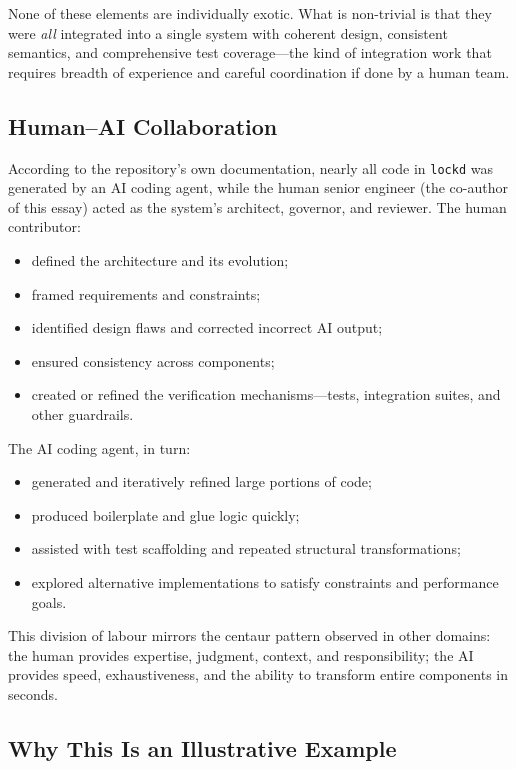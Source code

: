 \documentclass[11pt, a4paper, twocolumn]{article} %
\begin{document}
None of these elements are individually exotic. What is non-trivial is that they
were \emph{all} integrated into a single system with coherent design, consistent
semantics, and comprehensive test coverage---the kind of integration work that
requires breadth of experience and careful coordination if done by a human team.

\newpage
\subsection*{Human--AI Collaboration}

According to the repository’s own documentation, nearly all code in
\texttt{lockd} was generated by an AI coding agent, while the human senior
engineer (the co-author of this essay) acted as the system’s architect,
governor, and reviewer. The human contributor:
\begin{itemize}
    \item defined the architecture and its evolution;
    \item framed requirements and constraints;
    \item identified design flaws and corrected incorrect AI output;
    \item ensured consistency across components;
    \item created or refined the verification mechanisms---tests, integration
    suites, and other guardrails.
\end{itemize}

The AI coding agent, in turn:
\begin{itemize}
    \item generated and iteratively refined large portions of code;
    \item produced boilerplate and glue logic quickly;
    \item assisted with test scaffolding and repeated structural transformations;
    \item explored alternative implementations to satisfy constraints and
    performance goals.
\end{itemize}

This division of labour mirrors the centaur pattern observed in other domains:
the human provides expertise, judgment, context, and responsibility; the AI
provides speed, exhaustiveness, and the ability to transform entire components
in seconds.

\subsection*{Why This Is an Illustrative Example}
\end{document}
